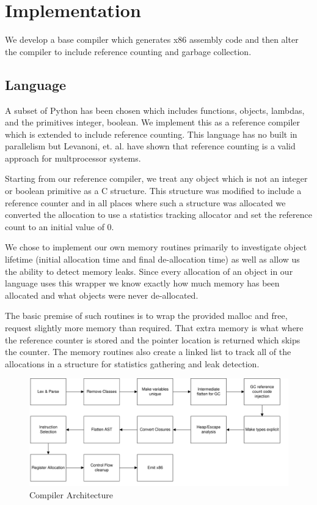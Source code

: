 \documentclass{sigplanconf}
\begin{document}
\section{Implementation}
We develop a base compiler which generates x86 assembly code and then alter the compiler to include reference counting and garbage collection.
\subsection{Language}
A subset of Python has been chosen which includes functions, objects, lambdas, and the primitives integer, boolean.  We implement this as a reference compiler which is extended to include reference counting.  This language has no built in parallelism but Levanoni, et. al. have shown that reference counting is a valid approach for multprocessor systems.\cite{levanoni}
\par
Starting from our reference compiler, we treat any object which is not an integer or boolean primitive as a C structure.  This structure was modified to include a reference counter and in all places where such a structure was allocated we converted the allocation to use a statistics tracking allocator and set the reference count to an initial value of 0.
\par
We chose to implement our own memory routines primarily to investigate object lifetime (initial allocation time and final de-allocation time) as well as allow us the ability to detect memory leaks.  Since every allocation of an object in our language uses this wrapper we know exactly how much memory has been allocated and what objects were never de-allocated.
\par
The basic premise of such routines is to wrap the provided malloc and free, request slightly more memory than required.  That extra memory is what where the reference counter is stored and the pointer location is returned which skips the counter.  The memory routines also create a linked list to track all of the allocations in a structure for statistics gathering and leak detection.
\begin{figure}
\begin{center}
\includegraphics[scale=0.48]{compiler_flow.pdf}
\end{center}
\caption{Compiler Architecture}
\label{fig-comparch}
\end{figure}
\end{document}

